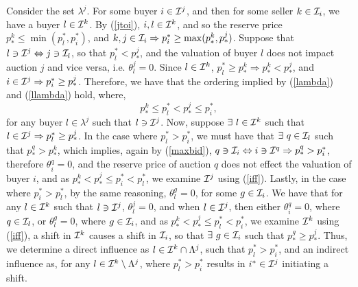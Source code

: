 {Consider the set $\lambda^j$. For some buyer $i\in\mathcal{I}^j$, and then for
some seller $k \in \mathcal{I}_i$, we have a buyer $l \in \mathcal{I}^k$. By (\ref{jtoi}), $i,l \in \mathcal{I}^k$, and so the reserve price $p_*^k \le \min(p_l^*,
p_i^*)$, and $k, j\in \mathcal{I}_i\Rightarrow p_i^* \ge \max(p_*^k, p_*^j)$.
Suppose that $l \ni \mathcal{I}^j\Leftrightarrow j \ni \mathcal{I}_l$, so
that $p_l^* < p_*^j$, and
the valuation of buyer $l$ does not impact auction $j$ and vice versa, i.e. $\theta_l^j = 0$. Since $l\in\mathcal{I}^k$, $p_l^* \ge p_*^k\Rightarrow
p_*^k < p_*^j$, and $i\in\mathcal{I}^j \Rightarrow p_i^* \ge p_*^j$. Therefore, we
have that the ordering implied by (\ref{lambda}) and (\ref{llambda}) hold,
where,
\begin{equation}\label{ordering}
    p_*^k \le p_l^* < p_*^j \le p_i^*,
\end{equation} 
for any buyer $l\in\lambda^j$ such that $l\ni \mathcal{I}^j$. Now, suppose $\exists \ l\in\mathcal{I}^k$ such that $l\in\mathcal{I}^j \Rightarrow p_l^* \ge
p_*^j$. In the case where $p_l^* > p_i^*$, we must have that 
$\exists \ q \in \mathcal{I}_l$ such that $p_*^q > p_*^k$, %
which implies, again by (\ref{maxbid}), $q\ni\mathcal{I}_i \Leftrightarrow i
\ni\mathcal{I}^q \Rightarrow p_*^q >
p_i^*$, therefore $\theta_i^q = 0$, and the reserve price of auction $q$ does not effect the valuation of
buyer $i$, and as $p_*^k < p_*^j \le p_i^* < p_l^*$, we examine $\mathcal{I}^j$ using
(\ref{iff}).
Lastly, in the case where $p_i^* > p_l^*$, by the same reasoning, $\theta_l^g =
0$, for some $g\in\mathcal{I}_i$.
We have that for any $l\in\mathcal{I}^k$ such that $l\ni
\mathcal{I}^j$, $\theta_l^j =0$, and when $l\in \mathcal{I}^j$, then either $\theta_i^q =0$,
where $q\in\mathcal{I}_l$, or $\theta_l^g = 0$, where $g\in\mathcal{I}_i$, and as $p_*^k <
p_*^j \le p_l^* < p_i^*$, we examine $\mathcal{I}^k$ using (\ref{iff}),
a shift in $\mathcal{I}^k$ causes a shift in $\mathcal{I}_i$, so that $\exists \ g\in\mathcal{I}_i$
such that $p_*^g \ge p_*^j$. Thus, we
determine a direct influence as $l\in\mathcal{I}^k
\cap \Lambda^j$, such that $p_l^* > p_i^*$,
and an indirect influence as, for any $l\in\mathcal{I}^k
\setminus \Lambda^j$, where $p_l^* > p_i^*$ results in $i^*\in\mathcal{I}^j$ initiating a shift.

}
